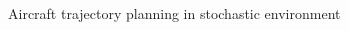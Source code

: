 \begin{figure}
\begin{center}
\begin{subfigmatrix}{2}
                     \end{subfigmatrix}
                     \caption{Aircraft trajectory planning in stochastic environment}
                     \label{fig:prob_decoupled}
                   \end{center}
                 \end{figure}


